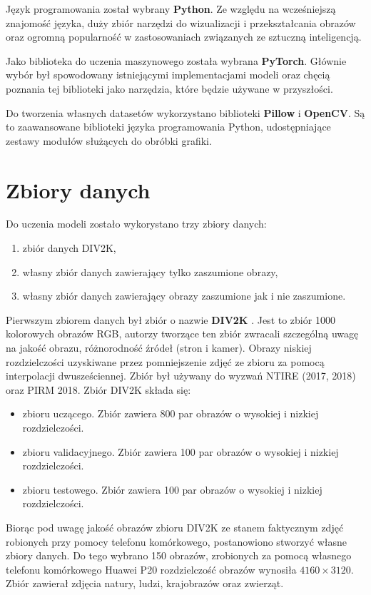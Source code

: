 \documentclass[a4paper,12pt,twoside,openany]{report}
\begin{document}
	Język programowania został wybrany \textbf{Python}. Ze względu na wcześniejszą znajomość języka, duży zbiór narzędzi do wizualizacji i przekształcania obrazów oraz ogromną popularność w zastosowaniach związanych ze sztuczną inteligencją.

	Jako biblioteka do uczenia maszynowego została wybrana \textbf{PyTorch}. Głównie wybór był spowodowany istniejącymi implementacjami modeli oraz chęcią poznania tej biblioteki jako narzędzia, które będzie używane w przyszłości.

	Do tworzenia własnych datasetów wykorzystano biblioteki \textbf{Pillow} i \textbf{OpenCV}. Są to zaawansowane biblioteki języka programowania Python, udostępniające zestawy modułów służących do obróbki grafiki.


\section{Zbiory danych}
\label{Zbior danych}
	Do uczenia modeli zostało wykorystano trzy zbiory danych:
	\begin{enumerate}
		\item zbiór  danych DIV2K,
		\item własny zbiór danych zawierający tylko  zaszumione obrazy,
		\item własny zbiór danych zawierający obrazy zaszumione jak i nie zaszumione.
	\end{enumerate}
	
	Pierwszym zbiorem danych był zbiór o nazwie \textbf{DIV2K} \cite{DIV2K}. Jest to zbiór 1000 kolorowych obrazów RGB, autorzy tworzące ten zbiór zwracali szczególną uwagę na jakość obrazu, różnorodność źródeł (stron i kamer). Obrazy niskiej rozdzielczości uzyskiwane przez pomniejszenie zdjęć ze zbioru za pomocą interpolacji dwusześciennej. Zbiór był używany do wyzwań NTIRE (2017, 2018) oraz PIRM 2018. Zbiór DIV2K składa się:
	\begin{itemize}
		\item zbioru uczącego. Zbiór zawiera 800 par obrazów  o  wysokiej  i nizkiej  rozdzielczości.
		\item zbioru validacyjnego.  Zbiór zawiera 100 par obrazów  o  wysokiej  i nizkiej  rozdzielczości.
		\item zbioru testowego. Zbiór zawiera 100 par obrazów  o  wysokiej  i nizkiej  rozdzielczości.
	\end{itemize}

	Biorąc pod uwagę jakość obrazów zbioru DIV2K ze stanem faktycznym zdjęć robionych przy pomocy telefonu komórkowego, postanowiono stworzyć własne zbiory danych. Do tego wybrano 150 obrazów, zrobionych za pomocą własnego telefonu komórkowego Huawei P20 rozdzielczość obrazów wynosiła $4160 \times 3120$. Zbiór zawierał zdjęcia natury, ludzi, krajobrazów oraz zwierząt.
\end{document}
